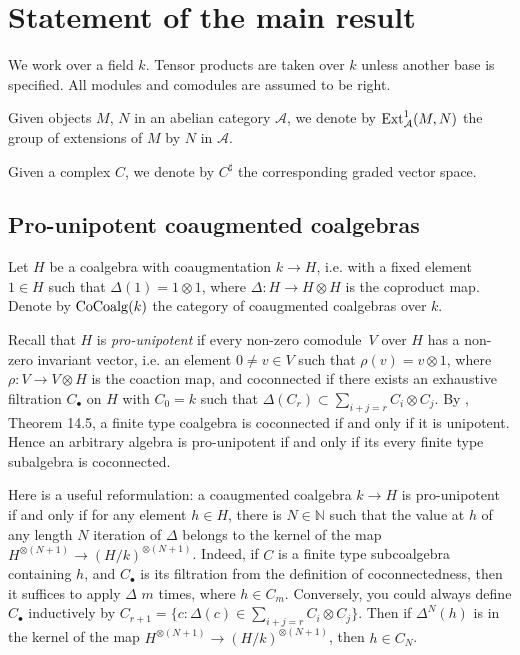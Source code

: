 \documentclass[10pt,russian]{article}
\theoremstyle{plain}
\theoremstyle{definition}
\newcommand{\CoCoalg}{{\rm CoCoalg}}
\newcommand{\Ext}{{\rm Ext}}
\begin{document}
	\section{Statement of the main result}
	\label{statement}

We work over a field $k$. Tensor products are taken over $k$ unless another base is specified. All modules and comodules are assumed to be right.

Given objects $M$, $N$ in an abelian category $\mathcal A$, we denote by $\Ext^1_{\mathcal A}(M,N)$ the group of extensions of $M$ by $N$ in $\mathcal A$.

Given a complex $C$, we denote by $C^{\sharp}$ the corresponding graded vector space.


\subsection{Pro-unipotent coaugmented coalgebras}\label{subsec:T}
	
	
Let $H$ be a coalgebra with coaugmentation ${k\to H}$, i.e. with a fixed element $1\in H$ such that $\Delta(1)=1\otimes 1$, where ${\Delta\colon H\to H\otimes H}$ is the coproduct map. Denote by $\CoCoalg(k)$ the category of coaugmented coalgebras over $k$. 

Recall that $H$ is \emph{pro-unipotent} if every non-zero comodule~$V$ over $H$ has a non-zero invariant vector, i.e. an element $0\ne v\in V$ such that $\rho(v)=v\otimes 1$, where ${\rho\colon V\to V\otimes H}$ is the coaction map, and coconnected if there exists an exhaustive filtration $C_{\bullet}$ on $H$ with $C_0=k$ such that $\Delta(C_r) \subset \sum_{i+j=r} C_i \otimes C_j$. By \cite{Milne}, Theorem 14.5, a finite type coalgebra is coconnected if and only if it is unipotent. Hence an arbitrary algebra is pro-unipotent if and only if its every finite type subalgebra is coconnected.

Here is a useful reformulation: a coaugmented coalgebra $k\to H$ is pro-unipotent if and only if for any element $h\in H$, there is $N\in {\mathbb N}$ such that the value at $h$ of any length $N$ iteration of $\Delta$ belongs to the kernel of the map ${H^{\otimes (N+1)}\to (H/k)^{\otimes (N+1)}}$. Indeed, if $C$ is a finite type subcoalgebra containing $h$, and $C_{\bullet}$ is its filtration from the definition of coconnectedness, then it suffices to apply $\Delta$ $m$ times, where $h \in C_m$. Conversely, you could always define $C_{\bullet}$ inductively by $C_{r+1}=\{c : \Delta(c) \in \sum_{i+j=r} C_i \otimes C_j \}$. Then if $\Delta^N(h)$ is in the kernel of the map ${H^{\otimes (N+1)}\to (H/k)^{\otimes (N+1)}}$, then $h \in C_N$.
\end{document}
